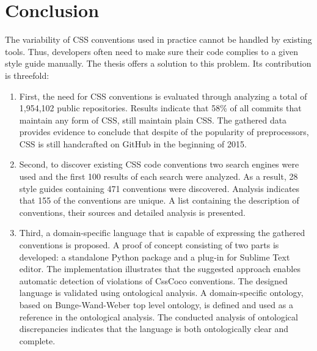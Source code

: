 \chapter{Conclusion}
\label{sec:conclusion}

The variability of CSS conventions used in practice cannot be handled by
existing tools. Thus, developers often need to make sure their code complies
to a given style guide manually. The thesis offers a solution to this problem.
Its contribution is threefold:

\begin{enumerate}
	\item First, the need for CSS conventions is evaluated through analyzing a total of 1,954,102 public repositories. Results indicate that 58\% of all commits that maintain any form of CSS, still maintain plain CSS. The gathered data provides evidence to conclude that despite of the popularity of preprocessors, CSS is still handcrafted on GitHub in the beginning of 2015.
	\item Second, to discover existing CSS code conventions two search engines were used and the first 100 results of each search were analyzed. As a result, 28 style guides containing 471 conventions were discovered. Analysis indicates that 155 of the conventions are unique. A list containing the description of conventions, their sources and detailed analysis is presented. 
	\item Third, a domain-specific language that is capable of expressing the gathered conventions is proposed. A proof of concept consisting of two parts is developed: a standalone Python package and a plug-in for Sublime Text editor. The implementation illustrates that the suggested approach enables automatic detection of violations of CssCoco conventions. The designed language is validated using ontological analysis. A domain-specific ontology, based on Bunge-Wand-Weber top level ontology, is defined and used as a reference in the ontological analysis. The conducted analysis of ontological discrepancies indicates that the language is both ontologically clear and complete.
\end{enumerate}

